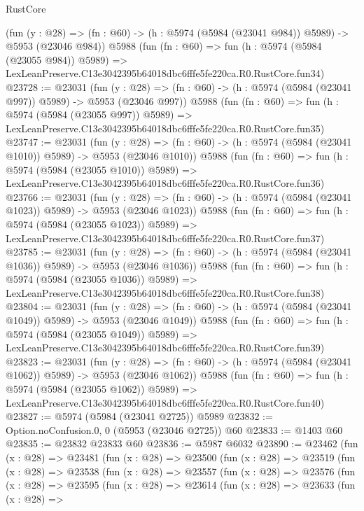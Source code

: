 \begin{lexlean}{RustCore}
\begin{coremodule}
    (fun (y : @28) => (fn : @60) -> (h : @5974 (@5984 (@23041 @984)) @5989) -> @5953 (@23046 @984))
    @5988
    (fun (fn : @60) =>
    fun (h : @5974 (@5984 (@23055 @984)) @5989) =>
    LexLeanPreserve.C13e3042395b64018dbc6fffe5fe220ca.R0.RustCore.fun34)
@23728 := @23031
    (fun (y : @28) => (fn : @60) -> (h : @5974 (@5984 (@23041 @997)) @5989) -> @5953 (@23046 @997))
    @5988
    (fun (fn : @60) =>
    fun (h : @5974 (@5984 (@23055 @997)) @5989) =>
    LexLeanPreserve.C13e3042395b64018dbc6fffe5fe220ca.R0.RustCore.fun35)
@23747 := @23031
    (fun (y : @28) =>
    (fn : @60) -> (h : @5974 (@5984 (@23041 @1010)) @5989) -> @5953 (@23046 @1010))
    @5988
    (fun (fn : @60) =>
    fun (h : @5974 (@5984 (@23055 @1010)) @5989) =>
    LexLeanPreserve.C13e3042395b64018dbc6fffe5fe220ca.R0.RustCore.fun36)
@23766 := @23031
    (fun (y : @28) =>
    (fn : @60) -> (h : @5974 (@5984 (@23041 @1023)) @5989) -> @5953 (@23046 @1023))
    @5988
    (fun (fn : @60) =>
    fun (h : @5974 (@5984 (@23055 @1023)) @5989) =>
    LexLeanPreserve.C13e3042395b64018dbc6fffe5fe220ca.R0.RustCore.fun37)
@23785 := @23031
    (fun (y : @28) =>
    (fn : @60) -> (h : @5974 (@5984 (@23041 @1036)) @5989) -> @5953 (@23046 @1036))
    @5988
    (fun (fn : @60) =>
    fun (h : @5974 (@5984 (@23055 @1036)) @5989) =>
    LexLeanPreserve.C13e3042395b64018dbc6fffe5fe220ca.R0.RustCore.fun38)
@23804 := @23031
    (fun (y : @28) =>
    (fn : @60) -> (h : @5974 (@5984 (@23041 @1049)) @5989) -> @5953 (@23046 @1049))
    @5988
    (fun (fn : @60) =>
    fun (h : @5974 (@5984 (@23055 @1049)) @5989) =>
    LexLeanPreserve.C13e3042395b64018dbc6fffe5fe220ca.R0.RustCore.fun39)
@23823 := @23031
    (fun (y : @28) =>
    (fn : @60) -> (h : @5974 (@5984 (@23041 @1062)) @5989) -> @5953 (@23046 @1062))
    @5988
    (fun (fn : @60) =>
    fun (h : @5974 (@5984 (@23055 @1062)) @5989) =>
    LexLeanPreserve.C13e3042395b64018dbc6fffe5fe220ca.R0.RustCore.fun40)
@23827 := @5974 (@5984 (@23041 @2725)) @5989
@23832 := Option.noConfusion.{0, 0} (@5953 (@23046 @2725)) @60
@23833 := @1403 @60
@23835 := @23832 @23833 @60
@23836 := @5987 @6032
@23890 := @23462
    (fun (x : @28) =>
    @23481
      (fun (x : @28) =>
      @23500
        (fun (x : @28) =>
        @23519
          (fun (x : @28) =>
          @23538
            (fun (x : @28) =>
            @23557
              (fun (x : @28) =>
              @23576
                (fun (x : @28) =>
                @23595
                  (fun (x : @28) =>
                  @23614
                    (fun (x : @28) =>
                    @23633
                      (fun (x : @28) =>

\end{coremodule}
\end{lexlean}
